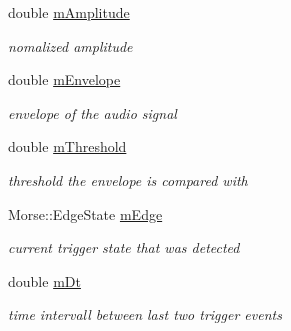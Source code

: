 \begin{DoxyCompactItemize}
\item 
\mbox{\label{classMorseDecode_acc486b544f75239a0fe7475d83f16364}} 
double \hyperlink{classMorseDecode_acc486b544f75239a0fe7475d83f16364}{m\+Amplitude}
\begin{DoxyCompactList}\small\item\em nomalized amplitude \end{DoxyCompactList}\item 
\mbox{\label{classMorseDecode_a6964d13d62429d00154b29296f6f57f4}} 
double \hyperlink{classMorseDecode_a6964d13d62429d00154b29296f6f57f4}{m\+Envelope}
\begin{DoxyCompactList}\small\item\em envelope of the audio signal \end{DoxyCompactList}\item 
\mbox{\label{classMorseDecode_a581a4a2c6ecb87ff4143e158fb886010}} 
double \hyperlink{classMorseDecode_a581a4a2c6ecb87ff4143e158fb886010}{m\+Threshold}
\begin{DoxyCompactList}\small\item\em threshold the envelope is compared with \end{DoxyCompactList}\item 
\mbox{\label{classMorseDecode_a3c55b5406edefe099d97168de64b7d16}} 
Morse\+::\+Edge\+State \hyperlink{classMorseDecode_a3c55b5406edefe099d97168de64b7d16}{m\+Edge}
\begin{DoxyCompactList}\small\item\em current trigger state that was detected \end{DoxyCompactList}\item 
\mbox{\label{classMorseDecode_af3067dd9f74a50291fec57eef3852b32}} 
double \hyperlink{classMorseDecode_af3067dd9f74a50291fec57eef3852b32}{m\+Dt}
\begin{DoxyCompactList}\small\item\em time intervall between last two trigger events \end{DoxyCompactList}\item 
\mbox{\label{classMorseDecode_a7f7235efc28159b04c81f58bbec2d0d8}} 

\end{DoxyCompactItemize}
